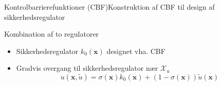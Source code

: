 \begin{frame}{Kontrolbarrierefunktioner (CBF)}{Konstruktion af CBF til design af sikkerhedsregulator}
\begin{block}{Kombination af to regulatorer}
\begin{itemize}
		\item Sikkerhedsregulator $k_0(\mathbf{x})$ designet vha. CBF %
		\item Gradvis overgang til sikkerhedsregulator nær $\mathcal{X}_u$
		\vspace{-1mm}
		\begin{equation*}
		u(\mathbf{x},\tilde{u})=\sigma(\mathbf{x})k_0(\mathbf{x})+(1-\sigma(\mathbf{x}))\tilde{u}(\mathbf{x})
		\end{equation*}
	\end{itemize}
\end{block}


	\vspace{5mm}
\end{frame}